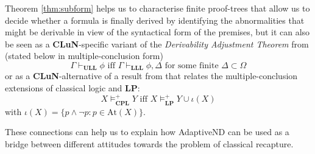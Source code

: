\documentclass[]{article}
\newcommand{\At}{\ensuremath{\mathrm{At}}}
\begin{document}
Theorem \ref{thm:subform} helps us to characterise finite proof-trees that allow us to decide whether a formula is finally derived by identifying the abnormalities that might be derivable in view of the syntactical form of the premises, but it can also be seen as a \textbf{CLuN}-specific variant of the \emph{Derivability Adjustment Theorem} from \cite{batens07} (stated below in multiple-conclusion form)
\[
    \Gamma \vdash_{\mathbf{ULL}} \phi \text{ iff } \Gamma \vdash_{\mathbf{LLL}} \phi, \Delta \text{ for some finite } \Delta \subset \Omega 
\]
or as a \textbf{CLuN}-alternative of a result from \cite{Beall:TheReviewOfSymbolicLogic:2011} that relates the multiple-conclusion extensions of classical logic and \textbf{LP}:
\[
    X \models_{\mathbf{CPL}}^+ Y \text{ iff } X \models_{\mathbf{LP}}^+ Y \cup \iota(X) \tag{LP/CLP}\label{beall}
\]
with $\iota(X) = \{p \wedge \neg p : p \in \At(X)\}$.

These connections can help us to explain how \textsf{AdaptiveND} can be used as a bridge between different attitudes towards the problem of classical recapture.
\end{document}
